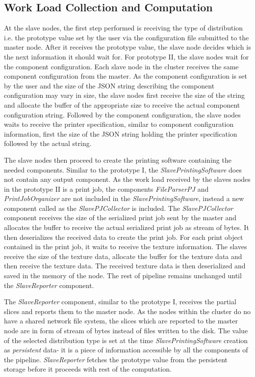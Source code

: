 \subsection{Work Load Collection and Computation}

At the slave nodes, the first step performed is receiving the type of distribution i.e. the prototype value set by the user via the configuration file submitted to the master node. After it receives the prototype value, the slave node decides which is the next information it should wait for. For prototype II, the slave nodes wait for the component configuration. Each slave node in the cluster receives the same component configuration from the master. As the component configuration is set by the user and the size of the JSON string describing the component configuration may vary in size, the slave nodes first receive the size of the string and allocate the buffer of the appropriate size to receive the actual component configuration string. Followed by the component configuration, the slave nodes waits to receive the printer specification, similar to component configuration information, first the size of the JSON string holding the printer specification followed by the actual string. \newline   

The slave nodes then proceed to create the printing software containing the needed components. Similar to the prototype I, the \textit{SlavePrintingSoftware} does not contain any output component. As the work load received by the slaves nodes in the prototype II is a print job, the components \textit{FileParserPJ} and \textit{PrintJobOrganizer} are not included in the \textit{SlavePrintingSoftware}, instead a new component called as the \textit{SlavePJCollector} is included. The \textit{SlavePJCollector} component receives the size of the serialized print job sent by the master and allocates the buffer to receive the actual serialized print job as stream of bytes. It then deserializes the received data to create the print job. For each print object contained in the print job, it waits to receive the texture information. The slaves receive the size of the texture data, allocate the buffer for the texture data and then receive the texture data. The received texture data is then deserialized and saved in the memory of the node. The rest of pipeline remains unchanged until the \textit{SlaveReporter} component.\newline

The \textit{SlaveReporter} component, similar to the prototype I, receives the partial slices and reports them to the master node. As the nodes within the cluster do no have a shared network file system, the slices which are reported to the master node are in form of stream of bytes instead of files written to the disk. The value of the selected distribution type is set at the time \textit{SlavePrintingSoftware} creation as \textit{persistent} data- it is a piece of information accessible by all the components of the pipeline. \textit{SlaveReporter} fetches the prototype value from the persistent storage before it proceeds with rest of the computation. \newline

